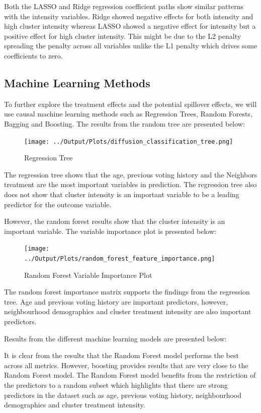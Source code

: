\documentclass[11pt]{article}
\begin{document}
Both the LASSO and Ridge regression coefficient paths show similar patterns with the intensity variables. Ridge showed negative effects for both intensity and high cluster intensity whereas LASSO showed a negative effect for intensity but a positive effect for high cluster intensity. This might be due to the L2 penalty spreading the penalty across all variables unlike the L1 penalty which drives some coefficients to zero.

\subsection{Machine Learning Methods}
To further explore the treatment effects and the potential spillover effects, we will use causal machine learning methods such as Regression Trees, Random Forests, Bagging and Boosting. The results from the random tree are presented below:
\begin{figure}[H]
    \centering
    \texttt{[image: ../Output/Plots/diffusion\_classification\_tree.png]}   
    \caption{Regression Tree}
    \label{fig:regression_tree}
\end{figure}
The regression tree shows that the age, previous voting history and the Neighbors treatment are the most important variables in prediction. The regression tree also does not show that cluster intensity is an important variable to be a leading predictor for the outcome variable.

However, the random forest results show that the cluster intensity is an important variable. The variable importance plot is presented below:
\begin{figure}[H]
    \centering
    \texttt{[image: ../Output/Plots/random\_forest\_feature\_importance.png]}   
    \caption{Random Forest Variable Importance Plot}
    \label{fig:random_forest}
\end{figure}
The random forest importance matrix supports the findings from the regression tree. Age and previous voting history are important predictors, however, neighbourhood demographics and cluster treatment intensity are also important predictors.

Results from the different machine learning models are presented below:


It is clear from the results that the Random Forest model performs the best across all metrics. However, boosting provides results that are very close to the Random Forest model. The Random Forest model benefits from the restriction of the predictors to a random subset which highlights that there are strong predictors in the dataset such as age, previous voting history, neighbourhood demographics and cluster treatment intensity.
\end{document}
